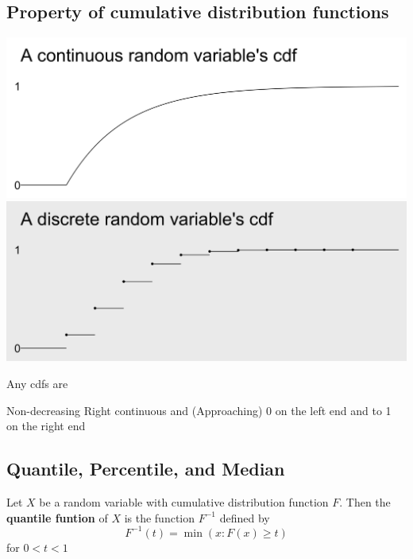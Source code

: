 \documentclass{article}
\begin{document}
\subsection{Property of cumulative distribution functions}
\begin{center}
\includegraphics[scale=.15]{crvcdf.png}
\includegraphics[scale=.15]{drvcdf.png}
\end{center}
\par Any cdfs are
\begin{outline}[enumerate]
\1 Non-decreasing
\1 Right continuous and
\1 (Approaching) 0 on the left end and to 1 on the right end
\end{outline}
\subsection{Quantile, Percentile, and Median}
\begin{definition}
Let $X$ be a random variable with cumulative distribution function $F$. Then the \textbf{quantile funtion} of $X$ is the function $F^{-1}$ defined by
$$F^{-1}(t) = \min(x: F(x) \geq t)$$
for $0 < t < 1$
\end{definition}
\end{document}
